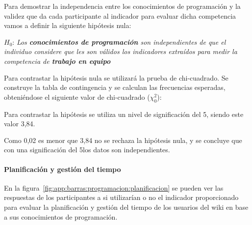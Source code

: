 Para demostrar la independencia entre los conocimientos de programación y la validez que da cada participante al indicador para evaluar dicha competencia vamos a definir la siguiente hipótesis nula:

\begin{mdframed}[style=hipotesis0]
$H_0$: \emph{Los \textbf{conocimientos de programación} son independientes de que el individuo considere que les son válidos los indicadores extraídos para medir la competencia de \textbf{trabajo en equipo}}
\end{mdframed}

Para contrastar la hipótesis nula se utilizará la prueba de chi-cuadrado. Se construye la tabla de contingencia y se calculan las frecuencias esperadas, obteniéndose el siguiente valor de chi-cuadrado ($\chi^2_0$): 

\begin{center}
\end{center}

Para contrastar la hipótesis se utiliza un nivel de significación del 5\percentage, siendo este valor 3,84. 

\begin{center}
\end{center}

Como 0,02 es menor que 3,84 no se rechaza la hipótesis nula, y se concluye que con una significación del 5\percentage los datos son independientes.

\begin{center}
\end{center}

\paragraph*{Planificación y gestión del tiempo}

En la figura~\ref{fig:app:barras:programacion:planificacion} se pueden ver las respuestas de los participantes a si utilizarían o no el indicador proporcionado para evaluar la planificación y gestión del tiempo de los usuarios del wiki en base a sus conocimientos de programación.

